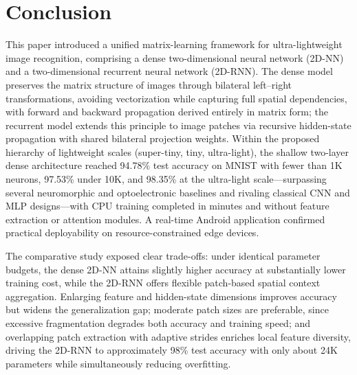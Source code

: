 \documentclass[pdflatex,sn-mathphys-num]{sn-jnl}%
\theoremstyle{thmstyleone}%
\theoremstyle{thmstyletwo}%
\theoremstyle{thmstylethree}%
\begin{document}
\section{Conclusion}\label{Conclusion}




This paper introduced a unified matrix-learning framework for ultra-lightweight image recognition, comprising a dense two-dimensional neural network (2D-NN) and a two-dimensional recurrent neural network (2D-RNN). The dense model preserves the matrix structure of images through bilateral left–right transformations, avoiding vectorization while capturing full spatial dependencies, with forward and backward propagation derived entirely in matrix form; the recurrent model extends this principle to image patches via recursive hidden-state propagation with shared bilateral projection weights. Within the proposed hierarchy of lightweight scales (super-tiny, tiny, ultra-light), the shallow two-layer dense architecture reached 94.78\% test accuracy on MNIST with fewer than 1K neurons, 97.53\% under 10K, and 98.35\% at the ultra-light scale—surpassing several neuromorphic and optoelectronic baselines and rivaling classical CNN and MLP designs—with CPU training completed in minutes and without feature extraction or attention modules. A real-time Android application confirmed practical deployability on resource-constrained edge devices.

The comparative study exposed clear trade-offs: under identical parameter budgets, the dense 2D-NN attains slightly higher accuracy at substantially lower training cost, while the 2D-RNN offers flexible patch-based spatial context aggregation. Enlarging feature and hidden-state dimensions improves accuracy but widens the generalization gap; moderate patch sizes are preferable, since excessive fragmentation degrades both accuracy and training speed; and overlapping patch extraction with adaptive strides enriches local feature diversity, driving the 2D-RNN to approximately 98\% test accuracy with only about 24K parameters while simultaneously reducing overfitting.
\end{document}
